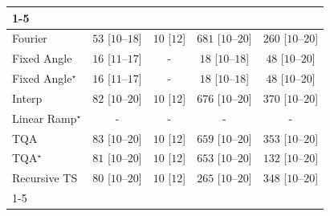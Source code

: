 \begin{tabular}{l|cccc|}
\cline{1-5}
\multicolumn{5}{c}{\rule{0pt}{8pt}SV} \\
\midrule
Fourier & {\cellcolor[HTML]{EEF8EA}} \color[HTML]{000000} $53$ [$10$--$18$] & {\cellcolor[HTML]{F7FCF5}} \color[HTML]{000000} $10$ [$12$] & {\cellcolor[HTML]{00441B}} \color[HTML]{F1F1F1} $681$ [$10$--$20$] & {\cellcolor[HTML]{A2D99C}} \color[HTML]{000000} $260$ [$10$--$20$] \\
Fixed Angle & {\cellcolor[HTML]{F6FCF4}} \color[HTML]{000000} $16$ [$11$--$17$] & {\cellcolor[HTML]{000000}} \color[HTML]{F1F1F1} {\cellcolor{white}} \color{black} - & {\cellcolor[HTML]{F5FBF3}} \color[HTML]{000000} $18$ [$10$--$18$] & {\cellcolor[HTML]{EFF9EC}} \color[HTML]{000000} $48$ [$10$--$20$] \\
Fixed Angle$^\star$ & {\cellcolor[HTML]{F6FCF4}} \color[HTML]{000000} $16$ [$11$--$17$] & {\cellcolor[HTML]{000000}} \color[HTML]{F1F1F1} {\cellcolor{white}} \color{black} - & {\cellcolor[HTML]{F5FBF3}} \color[HTML]{000000} $18$ [$10$--$18$] & {\cellcolor[HTML]{EFF9EC}} \color[HTML]{000000} $48$ [$10$--$20$] \\
Interp & {\cellcolor[HTML]{E8F6E3}} \color[HTML]{000000} $82$ [$10$--$20$] & {\cellcolor[HTML]{F7FCF5}} \color[HTML]{000000} $10$ [$12$] & {\cellcolor[HTML]{00451C}} \color[HTML]{F1F1F1} $676$ [$10$--$20$] & {\cellcolor[HTML]{65BD6F}} \color[HTML]{F1F1F1} $370$ [$10$--$20$] \\
Linear Ramp$^\star$ & {\cellcolor[HTML]{000000}} \color[HTML]{F1F1F1} {\cellcolor{white}} \color{black} - & {\cellcolor[HTML]{000000}} \color[HTML]{F1F1F1} {\cellcolor{white}} \color{black} - & {\cellcolor[HTML]{000000}} \color[HTML]{F1F1F1} {\cellcolor{white}} \color{black} - & {\cellcolor[HTML]{000000}} \color[HTML]{F1F1F1} {\cellcolor{white}} \color{black} - \\
TQA & {\cellcolor[HTML]{E8F6E3}} \color[HTML]{000000} $83$ [$10$--$20$] & {\cellcolor[HTML]{F7FCF5}} \color[HTML]{000000} $10$ [$12$] & {\cellcolor[HTML]{004E1F}} \color[HTML]{F1F1F1} $659$ [$10$--$20$] & {\cellcolor[HTML]{70C274}} \color[HTML]{000000} $353$ [$10$--$20$] \\
TQA$^\star$ & {\cellcolor[HTML]{E8F6E3}} \color[HTML]{000000} $81$ [$10$--$20$] & {\cellcolor[HTML]{F7FCF5}} \color[HTML]{000000} $10$ [$12$] & {\cellcolor[HTML]{005120}} \color[HTML]{F1F1F1} $653$ [$10$--$20$] & {\cellcolor[HTML]{D8F0D2}} \color[HTML]{000000} $132$ [$10$--$20$] \\
Recursive TS & {\cellcolor[HTML]{E8F6E4}} \color[HTML]{000000} $80$ [$10$--$20$] & {\cellcolor[HTML]{F7FCF5}} \color[HTML]{000000} $10$ [$12$] & {\cellcolor[HTML]{9FD899}} \color[HTML]{000000} $265$ [$10$--$20$] & {\cellcolor[HTML]{73C476}} \color[HTML]{000000} $348$ [$10$--$20$] \\
\cline{1-5}
\bottomrule
\end{tabular}

